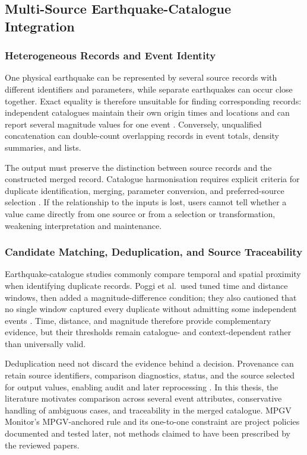 \documentclass[12pt]{article}
\begin{document}
\subsection{Multi-Source Earthquake-Catalogue Integration}

\subsubsection{Heterogeneous Records and Event Identity}

One physical earthquake can be represented by several source records with different identifiers and parameters, while separate earthquakes can occur close together. Exact equality is therefore unsuitable for finding corresponding records: independent catalogues maintain their own origin times and locations and can report several magnitude values for one event \cite[p.~2202]{Jonasson2021}. Conversely, unqualified concatenation can double-count overlapping records in event totals, density summaries, and lists.

The output must preserve the distinction between source records and the constructed merged record. Catalogue harmonisation requires explicit criteria for duplicate identification, merging, parameter conversion, and preferred-source selection \cite[p.~2599]{Poggi2024}. If the relationship to the inputs is lost, users cannot tell whether a value came directly from one source or from a selection or transformation, weakening interpretation and maintenance.

\subsubsection{Candidate Matching, Deduplication, and Source Traceability}

Earthquake-catalogue studies commonly compare temporal and spatial proximity when identifying duplicate records. Poggi et al.\ used tuned time and distance windows, then added a magnitude-difference condition; they also cautioned that no single window captured every duplicate without admitting some independent events \cite[p.~2602]{Poggi2024}. Time, distance, and magnitude therefore provide complementary evidence, but their thresholds remain catalogue- and context-dependent rather than universally valid.

Deduplication need not discard the evidence behind a decision. Provenance can retain source identifiers, comparison diagnostics, status, and the source selected for output values, enabling audit and later reprocessing \cite[p.~881]{Herschel2017}. In this thesis, the literature motivates comparison across several event attributes, conservative handling of ambiguous cases, and traceability in the merged catalogue. MPGV Monitor's MPGV-anchored rule and its one-to-one constraint are project policies documented and tested later, not methods claimed to have been prescribed by the reviewed papers.
\end{document}
